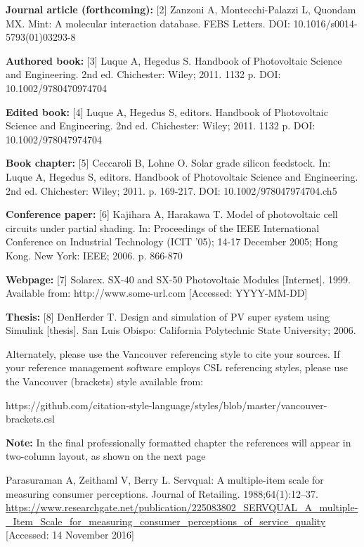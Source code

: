\documentclass[numbers,sort&compress]{IntechOpen-Book}%
\begin{document}
\begin{backmatter}
\textbf{Journal article (forthcoming):} [2] Zanzoni A, Montecchi-Palazzi L, Quondam MX. Mint: A molecular interaction database. FEBS Letters. DOI: 10.1016/s0014-5793(01)03293-8

\textbf{Authored book:} [3] Luque A, Hegedus S. Handbook of Photovoltaic Science and Engineering. 2nd ed. Chichester: Wiley; 2011. 1132 p. DOI: 10.1002/9780470974704

\textbf{Edited book:} [4] Luque A, Hegedus S, editors. Handbook of Photovoltaic Science and Engineering. 2nd ed. Chichester: Wiley; 2011. 1132 p. DOI: 10.1002/978047974704

\textbf{Book chapter:} [5] Ceccaroli B, Lohne O. Solar grade silicon feedstock. In: Luque A, Hegedus S, editors. Handbook of Photovoltaic Science and Engineering. 2nd ed. Chichester: Wiley; 2011. p. 169-217. DOI: 10.1002/978047974704.ch5

\textbf{Conference paper:} [6] Kajihara A, Harakawa T. Model of photovoltaic cell circuits under partial shading. In: Proceedings of the IEEE International Conference on Industrial Technology (ICIT '05); 14-17 December 2005; Hong Kong. New York: IEEE; 2006. p. 866-870

\textbf{Webpage:} [7] Solarex. SX-40 and SX-50 Photovoltaic Modules [Internet]. 1999. Available from: http://www.some-url.com [Accessed: YYYY-MM-DD]

\textbf{Thesis:} [8] DenHerder T. Design and simulation of PV super system using Simulink [thesis]. San Luis Obispo: California Polytechnic State University; 2006.

Alternately, please use the Vancouver referencing style to cite your sources. If your reference management software employs CSL referencing styles, please use the Vancouver (brackets) style available from:

https://github.com/citation-style-language/styles/blob/master/vancouver-brackets.csl

\textbf{Note:} In the final professionally formatted chapter the references will appear in two-column layout, as shown on the next page

\begin{thebibliography}{99}

 Parasuraman A, Zeithaml V, Berry L. Servqual: A multiple-item scale for measuring consumer perceptions. Journal of Retailing. 1988;64(1):12--37.
    \url{https://www.researchgate.net/publication/225083802_SERVQUAL_A_multiple-_Item_Scale_for_measuring_consumer_perceptions_of_service_quality}
[Accessed: 14 November 2016]


\end{thebibliography}
\end{backmatter}
\end{document}
